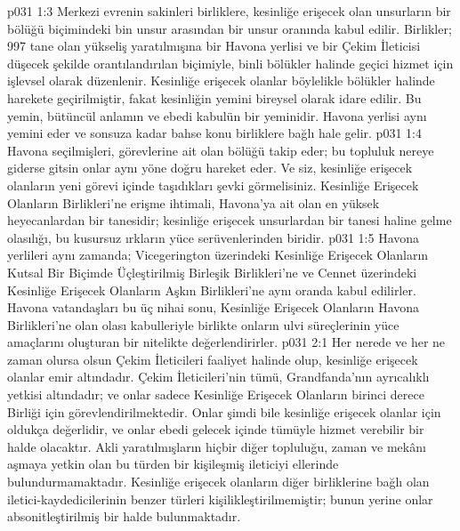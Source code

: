 \vs p031 1:3 Merkezi evrenin sakinleri birliklere, kesinliğe erişecek olan unsurların bir bölüğü biçimindeki bin unsur arasından bir unsur oranında kabul edilir. Birlikler; 997 tane olan yükseliş yaratılmışına bir Havona yerlisi ve bir Çekim İleticisi düşecek şekilde orantılandırılan biçimiyle, binli bölükler halinde geçici hizmet için işlevsel olarak düzenlenir. Kesinliğe erişecek olanlar böylelikle bölükler halinde harekete geçirilmiştir, fakat kesinliğin yemini bireysel olarak idare edilir. Bu yemin, bütüncül anlamın ve ebedi kabulün bir yeminidir. Havona yerlisi aynı yemini eder ve sonsuza kadar bahse konu birliklere bağlı hale gelir.
\vs p031 1:4 Havona seçilmişleri, görevlerine ait olan bölüğü takip eder; bu topluluk nereye giderse gitsin onlar aynı yöne doğru hareket eder. Ve siz, kesinliğe erişecek olanların yeni görevi içinde taşıdıkları şevki görmelisiniz. Kesinliğe Erişecek Olanların Birlikleri’ne erişme ihtimali, Havona’ya ait olan en yüksek heyecanlardan bir tanesidir; kesinliğe erişecek unsurlardan bir tanesi haline gelme olasılığı, bu kusursuz ırkların yüce serüvenlerinden biridir.
\vs p031 1:5 Havona yerlileri aynı zamanda; Vicegerington üzerindeki Kesinliğe Erişecek Olanların Kutsal Bir Biçimde Üçleştirilmiş Birleşik Birlikleri’ne ve Cennet üzerindeki Kesinliğe Erişecek Olanların Aşkın Birlikleri’ne aynı oranda kabul edilirler. Havona vatandaşları bu üç nihai sonu, Kesinliğe Erişecek Olanların Havona Birlikleri’ne olan olası kabulleriyle birlikte onların ulvi süreçlerinin yüce amaçlarını oluşturan bir nitelikte değerlendirirler.
\vs p031 2:1 Her nerede ve her ne zaman olursa olsun Çekim İleticileri faaliyet halinde olup, kesinliğe erişecek olanlar emir altındadır. Çekim İleticileri’nin tümü, Grandfanda’nın ayrıcalıklı yetkisi altındadır; ve onlar sadece Kesinliğe Erişecek Olanların birinci derece Birliği için görevlendirilmektedir. Onlar şimdi bile kesinliğe erişecek olanlar için oldukça değerlidir, ve onlar ebedi gelecek içinde tümüyle hizmet verebilir bir halde olacaktır. Akli yaratılmışların hiçbir diğer topluluğu, zaman ve mekânı aşmaya yetkin olan bu türden bir kişileşmiş ileticiyi ellerinde bulundurmamaktadır. Kesinliğe erişecek olanların diğer birliklerine bağlı olan iletici\hyp{}kaydedicilerinin benzer türleri kişilikleştirilmemiştir; bunun yerine onlar absonitleştirilmiş bir halde bulunmaktadır.
